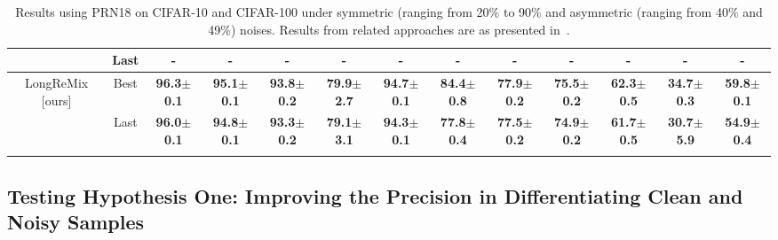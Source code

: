 \documentclass[review]{elsarticle}
\begin{document}
\begin{table}[ht]
{\begin{tabular}{cc|cccc|cc||cccc| c}
  & Last & - & - & - & -& - & - & - & - & - & - & -\\
\midrule
\multirow{2}{*}{LongReMix [ours] }& Best & \textbf{96.3$\pm$0.1} & \textbf{95.1$\pm$0.1} & \textbf{93.8$\pm$0.2} & \textbf{79.9$\pm$2.7} & \textbf{94.7$\pm$0.1} & \textbf{84.4$\pm$0.8} & \textbf{77.9$\pm$0.2} & \textbf{75.5$\pm$0.2} & \textbf{62.3$\pm$0.5} & \textbf{34.7$\pm$0.3}& \textbf{59.8$\pm$0.1}\\
    & Last & \textbf{96.0$\pm$0.1} & \textbf{94.8$\pm$0.1} & \textbf{93.3$\pm$0.2} & \textbf{79.1$\pm$3.1} & \textbf{94.3$\pm$0.1} & \textbf{77.8$\pm$0.4} & \textbf{77.5$\pm$0.2} & \textbf{74.9$\pm$0.2} & \textbf{61.7$\pm$0.5} & \textbf{30.7$\pm$5.9}& \textbf{54.9$\pm$0.4}\\
\bottomrule \\
\end{tabular}
}
\caption{Results using PRN18 on CIFAR-10 and CIFAR-100 under symmetric (ranging from 20\% to 90\% and asymmetric (ranging from 40\% and 49\%) noises. Results from related approaches are as presented in~\cite{li2020dividemix}.} 
\label{tab:results_cifar}
\end{table}




\subsection{Testing Hypothesis One: Improving the Precision in Differentiating Clean and Noisy Samples}
\label{sec:hypothesis_one_empirical_results}
\end{document}
